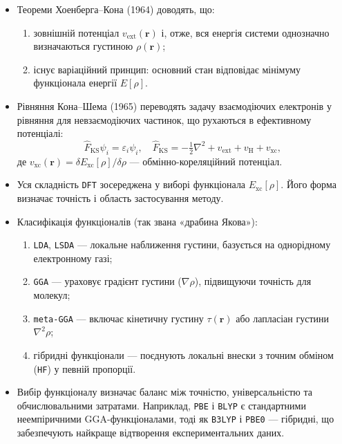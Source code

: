 \begin{itemize}
    \item Теореми Хоенберга--Кона (1964) доводять, що:
    \begin{enumerate}
        \item зовнішній потенціал $v_\mathrm{ext}(\mathbf{r})$ і, отже, вся енергія системи
        однозначно визначаються густиною $\rho(\mathbf{r})$;
        \item існує варіаційний принцип: основний стан відповідає мінімуму
        функціонала енергії $E[\rho]$.
    \end{enumerate}

    \item Рівняння Кона--Шема (1965) переводять задачу взаємодіючих електронів
    у рівняння для невзаємодіючих частинок, що рухаються в ефективному потенціалі:
    \[
    \hat{F}_\mathrm{KS} \psi_i = \varepsilon_i \psi_i,
    \quad
    \hat{F}_\mathrm{KS} = -\tfrac{1}{2}\nabla^2 + v_\mathrm{ext} + v_\mathrm{H} + v_\mathrm{xc},
    \]
    де $v_\mathrm{xc}(\mathbf{r}) = \delta E_\mathrm{xc}[\rho]/\delta\rho$ — обмінно-кореляційний потенціал.

    \item Уся складність \texttt{DFT} зосереджена у виборі функціонала $E_\mathrm{xc}[\rho]$.
    Його форма визначає точність і область застосування методу.

    \item Класифікація функціоналів (так звана «драбина Якова»):
    \begin{enumerate}
        \item \texttt{LDA}, \texttt{LSDA} --- локальне наближення густини, базується на однорідному електронному газі;
        \item \texttt{GGA} --- ураховує градієнт густини ($\nabla\rho$), підвищуючи точність для молекул;
        \item \texttt{meta-GGA} --- включає кінетичну густину $\tau(\mathbf{r})$ або лапласіан густини $\nabla^2\rho$;
        \item гібридні функціонали --- поєднують локальні внески з точним обміном (\texttt{HF}) у певній пропорції.
    \end{enumerate}

    \item Вибір функціоналу визначає баланс між точністю, універсальністю та обчислювальними затратами.
    Наприклад, \texttt{PBE} і \texttt{BLYP} є стандартними неемпіричними GGA-функціоналами,
    тоді як \texttt{B3LYP} і \texttt{PBE0} --- гібридні, що забезпечують найкраще відтворення експериментальних даних.


\end{itemize}
